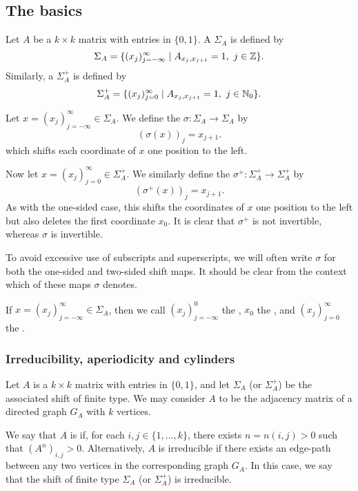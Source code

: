 \subsection{The basics}
Let $A$ be a $k \times k$ matrix with entries in $\{0, 1\}$. A  $\Sigma_A$ is defined by
\[
	\Sigma_A = \{(x_j)_{j = -\infty}^\infty \mid A_{x_j, x_{j + 1}} = 1,\ j \in \mathbb{Z}\}.
\]
Similarly, a  $\Sigma_A^+$ is defined by
\[
	\Sigma_A^+ = \{(x_j)_{j = 0}^\infty \mid A_{x_j, x_{j + 1}} = 1,\ j \in \mathbb{N}_0\}.
\]

Let $x = (x_j)_{j = -\infty}^\infty \in \Sigma_A$. We define the  $\sigma : \Sigma_A \to \Sigma_A$ by
\[
	(\sigma(x))_j = x_{j + 1}.
\]
which shifts each coordinate of $x$ one position to the left.

Now let $x = (x_j)_{j = 0}^\infty \in \Sigma_A^+$. We similarly define the  $\sigma^+ : \Sigma_A^+ \to \Sigma_A^+$ by
\[
	(\sigma^+(x))_j = x_{j + 1}.
\]
As with the one-sided case, this shifts the coordinates of $x$ one position to the left but also deletes the first coordinate $x_0$. It is clear that $\sigma^+$ is not invertible, whereas $\sigma$ is invertible.

To avoid excessive use of subscripts and superscripts, we will often write $\sigma$ for both the one-sided and two-sided shift maps. It should be clear from the context which of these maps $\sigma$ denotes.

If $x = (x_j)_{j = -\infty}^\infty \in \Sigma_A$, then we call $(x_j)_{j = -\infty}^0$ the , $x_0$ the , and $(x_j)_{j = 0}^\infty$ the .

\subsubsection{Irreducibility, aperiodicity and cylinders}
Let $A$ is a $k \times k$ matrix with entries in $\{0, 1\}$, and let $\Sigma_A$ (or $\Sigma_A^+$) be the associated shift of finite type. We may consider $A$ to be the adjacency matrix of a directed graph $G_A$ with $k$ vertices.

We say that $A$ is  if, for each $i, j \in \{1, \dots, k\}$, there exists $n = n(i, j) > 0$ such that $(A^n)_{i, j} > 0$. Alternatively, $A$ is irreducible if there exists an edge-path between any two vertices in the corresponding graph $G_A$. In this case, we say that the shift of finite type $\Sigma_A$ (or $\Sigma_A^+$) is irreducible.

